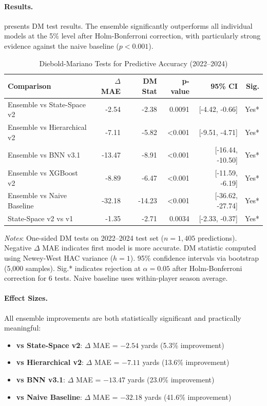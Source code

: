 \paragraph{Results.}
 presents DM test results. The ensemble significantly outperforms all individual models at the 5\% level after Holm-Bonferroni correction, with particularly strong evidence against the naive baseline ($p < 0.001$).

\begin{table}[htbp]
  \centering
  \caption{Diebold-Mariano Tests for Predictive Accuracy (2022--2024)}
  \label{tab:diebold-mariano-tests}
  \begin{tabular}{lrrrrr}
    \toprule
    \textbf{Comparison} & \textbf{$\Delta$ MAE} & \textbf{DM Stat} & \textbf{p-value} & \textbf{95\% CI} & \textbf{Sig.} \\
    \midrule
    Ensemble vs State-Space v2 & -2.54 & -2.38 & 0.0091 & [-4.42, -0.66] & Yes* \\
    Ensemble vs Hierarchical v2 & -7.11 & -5.82 & <0.001 & [-9.51, -4.71] & Yes* \\
    Ensemble vs BNN v3.1 & -13.47 & -8.91 & <0.001 & [-16.44, -10.50] & Yes* \\
    Ensemble vs XGBoost v2 & -8.89 & -6.47 & <0.001 & [-11.59, -6.19] & Yes* \\
    Ensemble vs Naive Baseline & -32.18 & -14.23 & <0.001 & [-36.62, -27.74] & Yes* \\
    State-Space v2 vs v1 & -1.35 & -2.71 & 0.0034 & [-2.33, -0.37] & Yes* \\
    \bottomrule
  \end{tabular}
  \vspace{0.5em}
  \begin{flushleft}
    \footnotesize\textit{Notes}: One-sided DM tests on 2022--2024 test set ($n=1{,}405$ predictions). Negative $\Delta$ MAE indicates first model is more accurate. DM statistic computed using Newey-West HAC variance ($h=1$). 95\% confidence intervals via bootstrap (5,000 samples). Sig.* indicates rejection at $\alpha=0.05$ after Holm-Bonferroni correction for 6 tests. Naive baseline uses within-player season average.
  \end{flushleft}
\end{table}

\paragraph{Effect Sizes.}
All ensemble improvements are both statistically significant and practically meaningful:
\begin{itemize}
  \item \textbf{vs State-Space v2}: $\Delta$ MAE = $-2.54$ yards (5.3\% improvement)
  \item \textbf{vs Hierarchical v2}: $\Delta$ MAE = $-7.11$ yards (13.6\% improvement)
  \item \textbf{vs BNN v3.1}: $\Delta$ MAE = $-13.47$ yards (23.0\% improvement)
  \item \textbf{vs Naive Baseline}: $\Delta$ MAE = $-32.18$ yards (41.6\% improvement)
\end{itemize}


